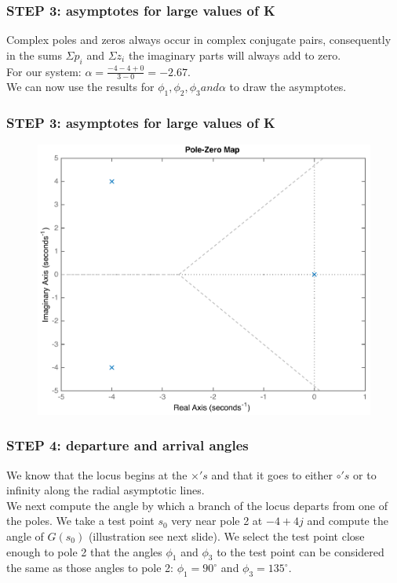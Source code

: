 \begin{frame}
\frametitle{STEP 3: asymptotes for large values of K}
	Complex poles and zeros always occur in complex conjugate pairs, consequently in the sums $\Sigma p_i$ and $\Sigma z_i$ the imaginary parts will always add to zero.\\
	\vspace{1em}
	For our system: $\alpha = \frac{-4-4+0}{3-0} = -2.67.$\\
	\vspace{1em}
	We can now use the results for $\phi_1, \phi_2, \phi_3 and \alpha$ to draw the asymptotes. 
\end{frame}

\begin{frame}
\frametitle{STEP 3: asymptotes for large values of K}
	\begin{figure}
		\centering
		\includegraphics[width=0.7\linewidth]{how_to_draw_ex3}
	\end{figure}
\end{frame}

\begin{frame}
\frametitle{STEP 4: departure and arrival angles}
	We know that the locus begins at the $\times's$ and that it goes to either $\circ's$ or to infinity along the radial asymptotic lines.\\
	\vspace{1em}
	We next compute the angle by which a branch of the locus departs from one of the poles. We take a test point $s_0$ very near pole 2 at $-4+4j$ and compute the angle of $G(s_0)$ (illustration see next slide). We select the test point close enough to pole 2 that the angles $\phi_1$ and $\phi_3$ to the test point can be considered the same as those angles to pole 2: $\phi_1 = 90^{\circ}$ and $\phi_3 = 135^{\circ}$. 
\end{frame}

